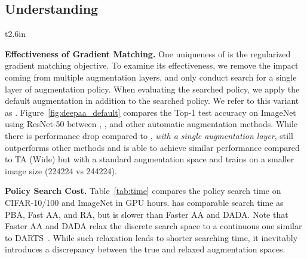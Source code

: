 \addtocounter{footnote}{-1}
\addtocounter{footnote}{1}


\subsection{Understanding \DAA{}}


\begin{wrapfigure}{t}{2.6in} \begin{minipage}{2.6in}
\centering
\vspace{-7mm}
\vspace{-5mm}
\caption{{\small Top-1 test accuracy (\%) on ImageNet of \DAAsimple{}, \DAA{}, and other automatic augmentation methods on ResNet-50.}}
\vspace{-3mm}
\label{fig:deepaa_default}
\end{minipage}
\end{wrapfigure}


\textbf{Effectiveness of Gradient Matching.} 
One uniqueness of \DAA{} is the regularized gradient matching objective.
To examine its effectiveness, we remove the impact coming from multiple augmentation layers, and only conduct search for a single layer of augmentation policy. When evaluating the searched policy, we apply the default augmentation in addition to the searched policy. We refer to this variant as \DAAsimple{}. 
Figure~\ref{fig:deepaa_default} compares the Top-1 test accuracy on ImageNet using ResNet-50 between \DAAsimple{}, \DAA{}, and other automatic augmentation methods. While there is  performance drop compared to \DAA{}, \textit{with a single augmentation layer}, \DAAsimple{} still outperforms other methods and is able to achieve similar performance compared to TA (Wide) but with a standard augmentation space and trains on a smaller image size (224224 vs 244224).


\textbf{Policy Search Cost.} 
Table~\ref{tab:time} compares the policy search time on CIFAR-10/100 and ImageNet in GPU hours. 
\DAA{} has comparable search time as PBA, Fast AA, and RA, but is slower than Faster AA and DADA. Note that Faster AA and DADA relax the discrete search space to a continuous one similar to DARTS~\citep{liu2018darts}. While such relaxation leads to shorter searching time, it inevitably introduces a discrepancy between the true and relaxed augmentation spaces.



